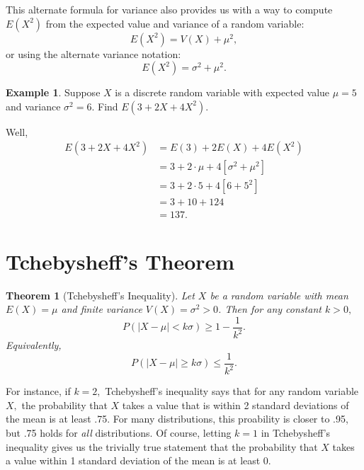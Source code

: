 \documentclass[
]{book}
\newtheorem{theorem}{Theorem}[chapter]
\theoremstyle{definition}
\theoremstyle{definition}
\newtheorem{example}{Example}[chapter]
\theoremstyle{definition}
\theoremstyle{definition}
\theoremstyle{remark}
\begin{document}
This alternate formula for variance also provides us with a way to compute \(E(X^2)\) from the expected value and variance of a random variable: \[E(X^2) = V(X) + \mu^2,\] or using the alternate variance notation:
\[E(X^2) = \sigma^2 + \mu^2.\]

\begin{example}
Suppose \(X\) is a discrete random variable with expected value \(\mu = 5\) and variance \(\sigma^2 = 6\).
Find \(E(3+2X+4X^2)\).

Well, \begin{align*}
E(3 + 2X + 4X^2) &= E(3) + 2E(X) + 4E(X^2) \\
                 &= 3 + 2\cdot \mu + 4[\sigma^2+\mu^2] \\
                 &= 3 + 2 \cdot 5 + 4[6 + 5^2] \\
                 &= 3 + 10 + 124 \\
                 &= 137.
\end{align*}
\end{example}

\section{Tchebysheff's Theorem}\label{tchebysheffs-theorem}

\begin{theorem}[Tchebysheff's Inequality]
\protect\hypertarget{thm:tcheby}{}\label{thm:tcheby}Let \(X\) be a random variable with mean \(E(X) = \mu\) and finite variance \(V(X) = \sigma^2 > 0\). Then for any constant \(k > 0,\)
\[P(|X - \mu| < k\sigma ) \geq 1 - \frac{1}{k^2}.\]
Equivalently, \[P(|X - \mu| \geq k\sigma) \leq \frac{1}{k^2}.\]
\end{theorem}

For instance, if \(k = 2,\) Tchebysheff's inequality says that for any random variable \(X,\) the probability that \(X\) takes a value that is within 2 standard deviations of the mean is at least .75. For many distributions, this proability is closer to .95, but .75 holds for \emph{all} distributions.
Of course, letting \(k = 1\) in Tchebysheff's inequality gives us the trivially true statement that the probability that \(X\) takes a value within 1 standard deviation of the mean is at least 0.
\end{document}
